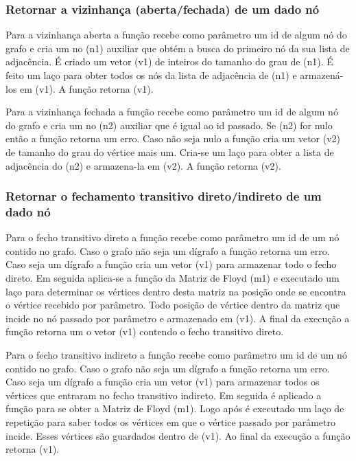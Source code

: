 \documentclass[a4paper, 12pt]{article}
\begin{document}
\subsubsection{Retornar a vizinhança (aberta/fechada) de um dado nó}
Para a vizinhança aberta a função recebe como parâmetro um id de algum nó do grafo e cria um no (n1) auxiliar que obtém a busca do primeiro nó da sua lista de adjacência. É criado um vetor (v1) de inteiros do tamanho do grau de (n1). É feito um laço para obter todos os nós da lista de adjacência de (n1) e armazená-los em (v1). A função retorna (v1).

Para a vizinhança fechada a função recebe como parâmetro um id de algum nó do grafo e cria um no (n2) auxiliar que é igual ao id passado. Se (n2) for nulo então a função retorna um erro. Caso não seja nulo a função cria um vetor (v2) de tamanho do grau do vértice mais um. Cria-se um laço para obter a lista de adjacência do (n2) e armazena-la em (v2). A função retorna (v2). 

\subsubsection{Retornar o fechamento transitivo direto/indireto de um dado nó}
Para o fecho transitivo direto a função recebe como parâmetro um id de um nó contido no grafo. Caso o grafo não seja um dígrafo a função retorna um erro. Caso seja um dígrafo a função cria um vetor (v1) para armazenar todo o fecho direto. Em seguida aplica-se a função da Matriz de Floyd (m1) e executado um laço para determinar os vértices dentro desta matriz na posição onde se encontra o vértice recebido por parâmetro. Todo posição de vértice dentro da matriz que incide no nó passado por parâmetro e armazenado em (v1). A final da execução a função retorna um o vetor (v1) contendo o fecho transitivo direto.

Para o fecho transitivo indireto a função recebe como parâmetro um id de um nó contido no grafo. Caso o grafo não seja um dígrafo a função retorna um erro. Caso seja um dígrafo a função cria um vetor (v1) para armazenar todos os vértices que entraram no fecho transitivo indireto. Em seguida é aplicado a função para se obter a Matriz de Floyd (m1). Logo após é executado um laço de repetição para saber todos os vértices em que o vértice passado por parâmetro incide. Esses vértices são guardados dentro de (v1). Ao final da execução a função retorna (v1).
\end{document}
